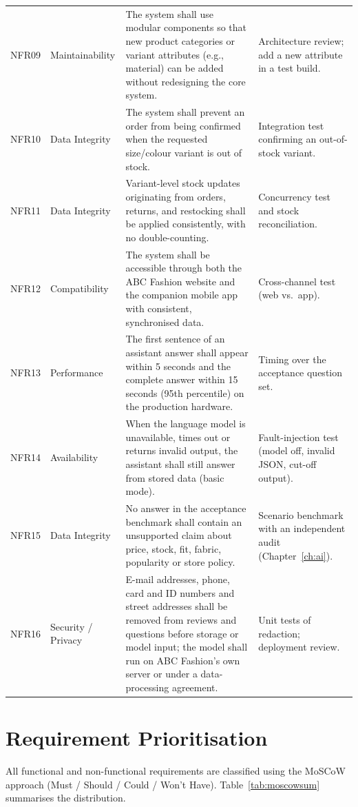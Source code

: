 \documentclass[11pt,a4paper,oneside]{extreport}
\newif\ifshowvtwo
\newcommand{\vtwocolor}{\ifshowvtwo\color{red}\fi}
\newcommand{\R}{\leavevmode\vtwocolor}   %
\begin{document}
{\begin{xltabular}{\textwidth}{@{}l L{1.9cm} Y L{3.6cm}@{}}
NFR09 & Maintainability & The system shall use modular components so that new product categories or variant attributes (e.g., material) can be added without redesigning the core system. & Architecture review; add a new attribute in a test build. \\
NFR10 & Data Integrity & The system shall prevent an order from being confirmed when the requested size/colour variant is out of stock. & Integration test confirming an out-of-stock variant. \\
NFR11 & Data Integrity & Variant-level stock updates originating from orders, returns, and restocking shall be applied consistently, with no double-counting. & Concurrency test and stock reconciliation. \\
NFR12 & Compatibility & The system shall be accessible through both the ABC Fashion website and the companion mobile app with consistent, synchronised data. & Cross-channel test (web vs.\ app). \\
\R NFR13 & \R Performance & \R The first sentence of an assistant answer shall appear within 5 seconds and the complete answer within 15 seconds (95th percentile) on the production hardware. & \R Timing over the acceptance question set. \\
\R NFR14 & \R Availability & \R When the language model is unavailable, times out or returns invalid output, the assistant shall still answer from stored data (basic mode). & \R Fault-injection test (model off, invalid JSON, cut-off output). \\
\R NFR15 & \R Data Integrity & \R No answer in the acceptance benchmark shall contain an unsupported claim about price, stock, fit, fabric, popularity or store policy. & \R Scenario benchmark with an independent audit (Chapter~\ref{ch:ai}). \\
\R NFR16 & \R Security / Privacy & \R E-mail addresses, phone, card and ID numbers and street addresses shall be removed from reviews and questions before storage or model input; the model shall run on ABC Fashion's own server or under a data-processing agreement. & \R Unit tests of redaction; deployment review. \\
\end{xltabular}
}

\section{Requirement Prioritisation}
\label{sec:moscow}
All functional and non-functional requirements are classified using the MoSCoW approach (Must / Should / Could / Won't Have). Table~\ref{tab:moscowsum} summarises the distribution.
\end{document}

